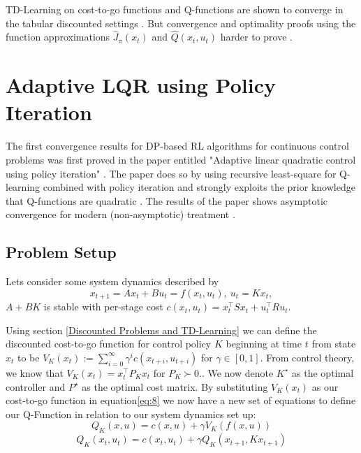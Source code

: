 \documentclass{article}[12pt]
\begin{document}
TD-Learning on cost-to-go functions and Q-functions are shown to converge in the tabular discounted settings \cite{Sutton} \cite{Brad94}. But convergence and optimality proofs using the function approximations $\hat J_\pi(x_t)$ and $\hat{Q}(x_t,u_t)$ harder to prove \cite{QConvergence}.

\section{Adaptive LQR using Policy Iteration}
The first convergence results for DP-based RL algorithms for continuous control problems was first proved in the paper entitled "Adaptive linear quadratic control using policy iteration" \cite{Brad94}. The paper does so by using recursive least-square for Q-learning combined with policy iteration and strongly exploits the prior knowledge that Q-functions are quadratic \cite{Sutton}. The results of the paper shows asymptotic convergence for modern (non-asymptotic) treatment \cite{Brad94}.

\subsection{Problem Setup}
Lets consider some system dynamics described by
\[
x_{t+1} = Ax_t + Bu_t = f(x_t,u_t), \ u_t = Kx_t, 
\]
$A+BK$ is stable with per-stage cost $c(x_t,u_t) = x_t^\top S x_t + u_t^\top R u_t$. \\
\newpage

Using section \ref{Discounted Problems and TD-Learning} we can define the discounted cost-to-go function for control policy $K$ beginning at time $t$ from state $x_t$ to be $V_K(x_t) := \sum_{i=0}^\infty \gamma^i c(x_{t+i},u_{t+i})$ for $\gamma \in [0,1]$. From control theory, we know that $V_K(x_t) = x_t^\top P_K x_t$ for $P_K \succ 0.$.
We now denote $K^\star$ as the optimal controller and $P^\star$ as the optimal cost matrix. By substituting $V_K(x_t)$ as our cost-to-go function in equation\eqref{eq:8} we now have a new set of equations to define our Q-Function in relation to our system dynamics set up:
\begin{equation}\label{eq:10}
    Q_{K}(x, u)=c(x, u)+\gamma V_{K}(f(x, u))
\end{equation}
\begin{equation}\label{eq:11}
    Q_{K}\left(x_{t}, u_{t}\right)=c\left(x_{t}, u_{t}\right)+\gamma Q_{K}\left(x_{t+1}, K x_{t+1}\right)
\end{equation}
\end{document}
